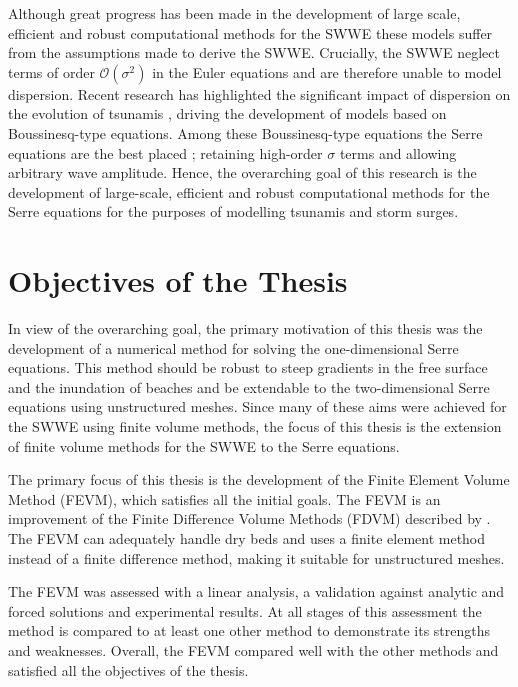 
Although great progress has been made in the development of large scale, efficient and robust computational methods for the SWWE \cite{ClawPack,ANUGA} these models suffer from the assumptions made to derive the SWWE. Crucially, the SWWE neglect terms of order $\mathcal{O}\left(\sigma ^2\right)$ in the Euler equations and are therefore unable to model dispersion. Recent research has highlighted the significant impact of dispersion on the evolution of tsunamis \cite{Grue-etal-2008-113,Kirby-etal-2013-39}, driving the development of models based on Boussinesq-type equations. Among these Boussinesq-type equations the Serre equations are the best placed \cite{Bonneton-Lannes-2009-16601}; retaining high-order $\sigma$ terms and allowing arbitrary wave amplitude. Hence, the overarching goal of  this research is the development of large-scale, efficient and robust computational methods for the Serre equations for the purposes of modelling tsunamis and storm surges.

\section{Objectives of the Thesis}
In view of the overarching goal, the primary motivation of this thesis was the development of a numerical method for solving the one-dimensional Serre equations. This method should be robust to steep gradients in the free surface and the inundation of beaches and be extendable to the two-dimensional Serre equations using unstructured meshes. Since many of these aims were achieved for the SWWE using finite volume methods, the focus of this thesis is the extension of finite volume methods for the SWWE to the Serre equations. 

The primary focus of this thesis is the development of the Finite Element Volume Method (FEVM), which satisfies all the initial goals. The FEVM is an improvement of the Finite Difference Volume Methods (FDVM) described by \citet{Zoppou-2014}. The FEVM can adequately handle dry beds and uses a finite element method instead of a finite difference method, making it suitable for unstructured meshes. 

The FEVM was assessed with a linear analysis, a validation against analytic and forced solutions and experimental results. At all stages of this assessment the method is compared to at least one other method to demonstrate its strengths and weaknesses. Overall, the FEVM compared well with the other methods and satisfied all the objectives of the thesis.

